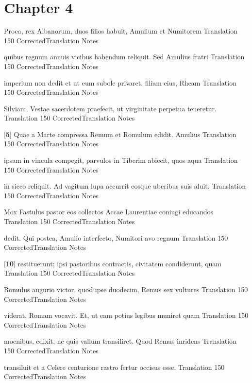 \chapter*{Chapter 4} %
\label{sec:chapter_4}

\latline
  {Proca, rex Albanorum, duos filios habuit, Amulium et Numitorem }
  { Translation }
  {150}
  { CorrectedTranslation }
  { Notes }


\latline
  {quibus regnum annuis vicibus habendum reliquit. Sed Amulius fratri}
  { Translation }
  {150}
  { CorrectedTranslation }
  { Notes }


\latline
  {imperium non dedit et ut eum subole privaret, filiam eius, Rheam }
  { Translation }
  {150}
  { CorrectedTranslation }
  { Notes }


\latline
  {Silviam, Vestae sacerdotem praefecit, ut virginitate perpetua teneretur.}
  { Translation }
  {150}
  { CorrectedTranslation }
  { Notes }


\latline
  {[\textbf{5}] Quae a Marte compressa Remum et Romulum edidit.  Amulius }
  { Translation }
  {150}
  { CorrectedTranslation }
  { Notes }


\latline
  {ipsam in vincula compegit, parvulos in Tiberim abiecit, quos aqua }
  { Translation }
  {150}
  { CorrectedTranslation }
  { Notes }


\latline
  {in sicco reliquit.  Ad vagitum lupa accurrit eosque uberibus suis aluit. }
  { Translation }
  {150}
  { CorrectedTranslation }
  { Notes }


\latline
  {Mox Fastulus pastor eos collectos Accae Laurentiae coniugi educandos }
  { Translation }
  {150}
  { CorrectedTranslation }
  { Notes }


\latline
  {dedit. Qui postea, Amulio interfecto, Numitori avo regnum }
  { Translation }
  {150}
  { CorrectedTranslation }
  { Notes }


\latline
  {[\textbf{10}] restituerunt; ipsi pastoribus contractis, civitatem condiderunt, quam }
  { Translation }
  {150}
  { CorrectedTranslation }
  { Notes }


\latline
  {Romulus augurio victor, quod ipse duodecim, Remus sex vultures }
  { Translation }
  {150}
  { CorrectedTranslation }
  { Notes }


\latline
  {viderat, Romam vocavit.  Et, ut eam potius legibus muniret quam }
  { Translation }
  {150}
  { CorrectedTranslation }
  { Notes }


\latline
  {moenibus, edixit, ne quis vallum transiliret.  Quod Remus inridens}
  { Translation }
  {150}
  { CorrectedTranslation }
  { Notes }


\latline
  {transiluit et a Celere centurione rastro fertur occisus esse.}
  { Translation }
  {150}
  { CorrectedTranslation }
  { Notes }





